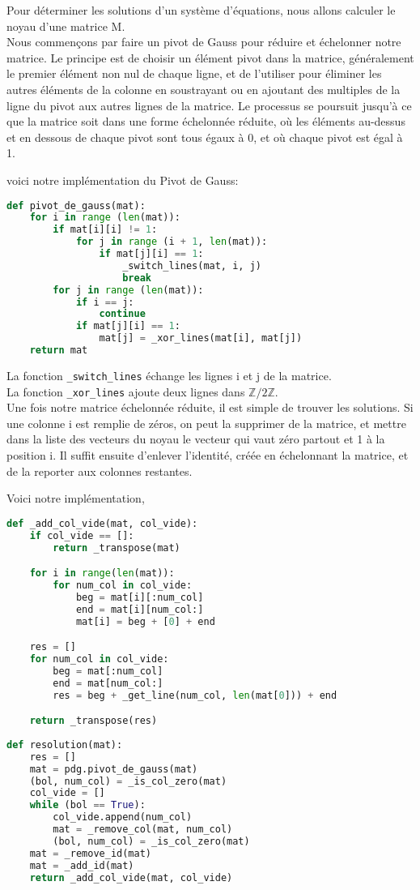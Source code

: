 Pour déterminer les solutions d'un système d'équations, nous allons calculer le noyau d'une matrice M.\\
Nous commençons par faire un pivot de Gauss pour réduire et échelonner notre matrice.
Le principe est de choisir un élément pivot dans la matrice, généralement le premier élément non nul de chaque ligne, et de l'utiliser pour éliminer les autres éléments de la colonne en soustrayant ou en ajoutant des multiples de la ligne du pivot aux autres lignes de la matrice. 
Le processus se poursuit jusqu'à ce que la matrice soit dans une forme échelonnée réduite, où les éléments au-dessus et en dessous de chaque pivot sont tous égaux à 0, et où chaque pivot est égal à 1.

voici notre implémentation du Pivot de Gauss:
\begin{lstlisting}[language=Python]
def pivot_de_gauss(mat):
    for i in range (len(mat)):
        if mat[i][i] != 1:
            for j in range (i + 1, len(mat)):
                if mat[j][i] == 1:
                    _switch_lines(mat, i, j)
                    break
        for j in range (len(mat)):
            if i == j:
                continue
            if mat[j][i] == 1:
                mat[j] = _xor_lines(mat[i], mat[j])
    return mat
\end{lstlisting}
\vspace{1em}
La fonction \lstinline{_switch_lines} échange les lignes i et j de la matrice.\\
La fonction \lstinline{_xor_lines} ajoute deux lignes dans $\mathbb{Z}/2\mathbb{Z}$.\\

Une fois notre matrice échelonnée réduite, il est simple de trouver les solutions.
Si une colonne i est remplie de zéros, on peut la supprimer de la matrice, et mettre dans la liste des vecteurs du noyau le vecteur qui vaut zéro partout et 1 à la position i.
Il suffit ensuite d'enlever l'identité, créée en échelonnant la matrice, et de la reporter aux colonnes restantes.

Voici notre implémentation,
\newpage
\begin{lstlisting}[language=Python]
def _add_col_vide(mat, col_vide):
	if col_vide == []:
		return _transpose(mat)

	for i in range(len(mat)):
		for num_col in col_vide:
			beg = mat[i][:num_col]
			end = mat[i][num_col:]
			mat[i] = beg + [0] + end

	res = []
	for num_col in col_vide:
		beg = mat[:num_col]
		end = mat[num_col:]
		res = beg + _get_line(num_col, len(mat[0])) + end

	return _transpose(res)
 
def resolution(mat):
	res = []
	mat = pdg.pivot_de_gauss(mat)
	(bol, num_col) = _is_col_zero(mat)
	col_vide = []
	while (bol == True):
		col_vide.append(num_col)
		mat = _remove_col(mat, num_col)
		(bol, num_col) = _is_col_zero(mat)
	mat = _remove_id(mat)
	mat = _add_id(mat)
	return _add_col_vide(mat, col_vide)
\end{lstlisting}
\vspace{1em}


